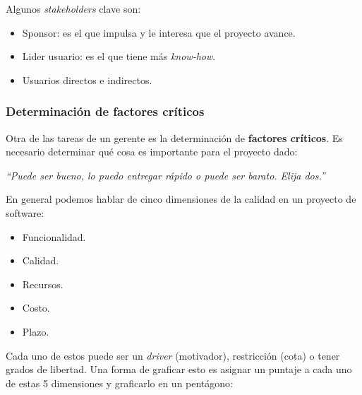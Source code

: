 \documentclass[]{article}
\begin{document}
Algunos \emph{stakeholders} clave son:
\begin{itemize}
	\item Sponsor: es el que impulsa y le interesa que el proyecto avance.
	\item Lider usuario: es el que tiene más \emph{know-how}.
	\item Usuarios directos e indirectos.
\end{itemize}

\subsubsection{Determinación de factores críticos}
Otra de las tareas de un gerente es la determinación de \textbf{factores críticos}. Es necesario determinar qué cosa es importante para el proyecto dado:

\begin{center}
	\emph{``Puede ser bueno, lo puedo entregar rápido o puede ser barato. Elija dos.''}
\end{center}

En general podemos hablar de cinco dimensiones de la calidad en un proyecto de software:
\begin{itemize}
	\item Funcionalidad.
	\item Calidad.
	\item Recursos.
	\item Costo.
	\item Plazo.
\end{itemize}

Cada uno de estos puede ser un \emph{driver} (motivador), restricción (cota) o tener grados de libertad. Una forma de graficar esto es asignar un puntaje a cada uno de estas 5 dimensiones y graficarlo en un pentágono:
\end{document}
